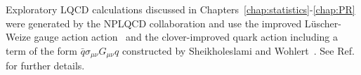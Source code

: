 Exploratory LQCD calculations discussed in Chapters~\ref{chap:statistics}-\ref{chap:PR} were generated by the NPLQCD collaboration and use 
the improved L{\"u}scher-Weize gauge action action~\cite{Luscher:1984xn} and
the clover-improved quark action including a term of the form $\bar{q}\sigma_{\mu\nu}G_{\mu\nu}q$ constructed by Sheikholeslami and Wohlert~\cite{Sheikholeslami:1985ij}.
See Ref.~\cite{Orginos:2015aya} for further details.


